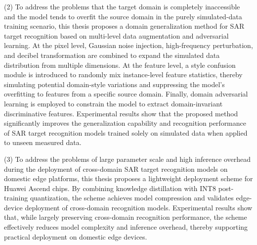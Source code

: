 \begin{eabstract}
(2) To address the problems that the target domain is completely inaccessible and the model tends to overfit the source domain in the purely simulated-data training scenario, this thesis proposes a domain generalization method for SAR target recognition based on multi-level data augmentation and adversarial learning. At the pixel level, Gaussian noise injection, high-frequency perturbation, and decibel transformation are combined to expand the simulated data distribution from multiple dimensions. At the feature level, a style confusion module is introduced to randomly mix instance-level feature statistics, thereby simulating potential domain-style variations and suppressing the model's overfitting to features from a specific source domain. Finally, domain adversarial learning is employed to constrain the model to extract domain-invariant discriminative features. Experimental results show that the proposed method significantly improves the generalization capability and recognition performance of SAR target recognition models trained solely on simulated data when applied to unseen measured data.

(3) To address the problems of large parameter scale and high inference overhead during the deployment of cross-domain SAR target recognition models on domestic edge platforms, this thesis proposes a lightweight deployment scheme for Huawei Ascend chips. By combining knowledge distillation with INT8 post-training quantization, the scheme achieves model compression and validates edge-device deployment of cross-domain recognition models. Experimental results show that, while largely preserving cross-domain recognition performance, the scheme effectively reduces model complexity and inference overhead, thereby supporting practical deployment on domestic edge devices.

\end{eabstract}
